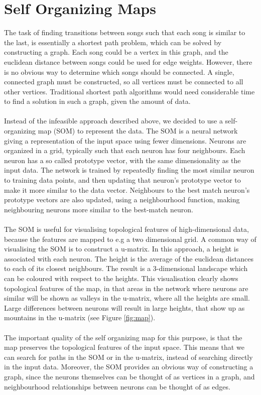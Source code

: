 \section{Self Organizing Maps} %
\label{sec:self_organizing_maps}
The task of finding transitions between songs such that each song is similar to the last, is essentially a shortest path problem, which can be solved by constructing a graph. Each song could be a vertex in this graph, and the euclidean distance between songs could be used for edge weights. However, there is no obvious way to determine which songs should be connected. A single, connected graph must be constructed, so all vertices must be connected to all other vertices. Traditional shortest path algorithms would need considerable time to find a solution in such a graph, given the amount of data.
\\\\
Instead of the infeasible approach described above, we decided to use a self-organizing map (SOM) to represent the data. The SOM is a neural network giving a representation of the input space using fewer dimensions. Neurons are organized in a grid, typically such that each neuron has four neighbours. Each neuron has a so called prototype vector, with the same dimensionality as the input data. The network is trained by repeatedly finding the most similar neuron to training data points, and then updating that neuron's prototype vector to make it more similar to the data vector. Neighbours to the best match neuron's prototype vectors are also updated, using a neighbourhood function, making neighbouring neurons more similar to the best-match neuron.
\\\\
The SOM is useful for visualising topological features of high-dimensional data, because the features are mapped to e.g a two dimensional grid. A common way of visualising the SOM is to construct a u-matrix. In this approach, a height is associated with each neuron. The height is the average of the euclidean distances to each of its closest neighbours. The result is a 3-dimensional landscape which can be coloured with respect to the heights. This visualisation clearly shows topological features of the map, in that areas in the network where neurons are similar will be shown as valleys in the u-matrix, where all the heights are small. Large differences between neurons will result in large heights, that show up as mountains in the u-matrix (see Figure \ref{fig:map}).
\\\\
The important quality of the self organizing map for this purpose, is that the map preserves the topological features of the input space. This means that we can search for paths in the SOM or in the u-matrix, instead of searching directly in the input data. Moreover, the SOM provides an obvious way of constructing a graph, since the neurons themselves can be thought of as vertices in a graph, and neighbourhood relationships between neurons can be thought of as edges.

